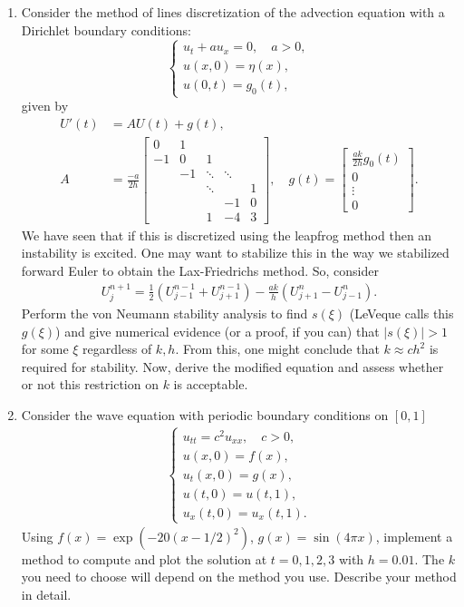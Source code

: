 \documentclass[10pt]{amsart}
\begin{document}
\begin{enumerate}[label={\bf Problem~{\arabic*}:}]
  \mline
\item Consider the method of lines discretization of the advection equation with a Dirichlet boundary conditions:
  $$ \begin{cases} u_t + a u_{x} = 0, \quad a > 0,\\
u(x,0) = \eta(x),\\
u(0,t) = g_0(t), \end{cases} $$
given by
\begin{align*}
  U'(t) &= A U(t) + g(t),\\
  A &= \frac{-a}{2h} \begin{bmatrix} 0 & 1 \\
    -1 & 0 & 1 \\
    & -1 & \ddots & \ddots \\
    && \ddots && 1\\
    &&& -1 & 0 \\
    &&1 & -4 & 3
  \end{bmatrix}, \quad g(t) = \begin{bmatrix} \frac{ak}{2h} g_0(t) \\ 0 \\ \vdots \\ 0 \end{bmatrix}.
\end{align*}
We have seen that if this is discretized using the leapfrog method then an instability is excited.  One may want to stabilize this in the way we stabilized forward Euler to obtain the Lax-Friedrichs method.  So, consider
\begin{align*}
  U_j^{n+1} = \frac 1 2 ( U_{j-1}^{n-1} + U_{j+1}^{n-1}) - \frac{ak}{h} ( U_{j+1}^n - U_{j-1}^n).
\end{align*}
Perform the von Neumann stability analysis to find $s(\xi)$ (LeVeque calls this $g(\xi)$) and give numerical evidence (or a proof, if you can) that $|s(\xi)| > 1$ for some $\xi$ regardless of $k,h$.  From this, one might conclude that $k \approx c h^2$ is required for stability.  Now, derive the modified equation and assess whether or not this restriction on $k$ is acceptable.

\mline
\item Consider the wave equation with periodic boundary conditions on $[0,1]$
  \begin{align*}
    \begin{cases}
      u_{tt} = c^2 u_{xx}, \quad c > 0,\\
      u(x,0) = f(x),\\
      u_t(x,0) = g(x),\\
      u(t,0) = u(t,1),\\
      u_x(t,0) = u_x(t,1).
    \end{cases}
  \end{align*}
  Using $f(x) = \exp( -20(x-1/2)^2 )$, $g(x) = \sin(4\pi x)$, implement a method to compute and plot the solution at $t = 0,1,2,3$ with $h = 0.01$.  The $k$ you need to choose will depend on the method you use.  Describe your method in detail.


\end{enumerate}
\end{document}
